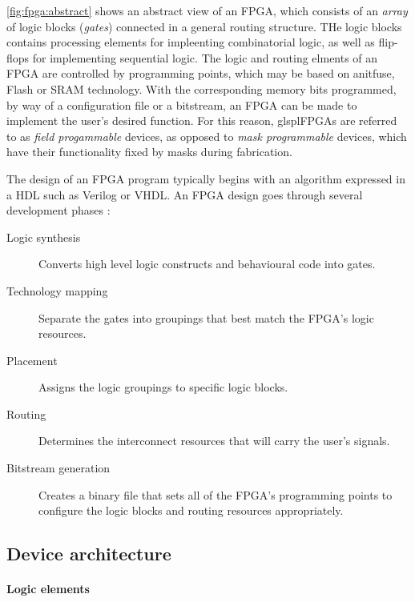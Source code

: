\autoref{fig:fpga:abstract} shows an abstract view of an \gls{FPGA}, which
consists of an \emph{array} of logic blocks (\emph{gates}) connected in a
general routing structure. THe logic blocks contains processing elements for
impleenting combinatorial logic, as well as flip-flops for implementing
sequential logic. The logic and routing elments of an \gls{FPGA} are controlled
by programming points, which may be based on anitfuse, Flash  or \gls{SRAM}
technology. With the corresponding memory bits programmed, by way of a
configuration file or a bitstream, an \gls{FPGA} can be made to implement the
user's desired function. For this reason, glspl{FPGAs} are referred to as
\emph{field progammable} devices, as opposed to \emph{mask programmable}
devices, which have their  functionality fixed by masks during fabrication.

The design of an \gls{FPGA} program typically begins with an algorithm expressed
in a \gls{HDL} such as Verilog or \gls{VHDL}. An \gls{FPGA} design goes through
several development phases \cite{Hauck:2007}:
\begin{description}
    \item[Logic synthesis] Converts high level logic constructs and behavioural
        code into gates.
    \item[Technology mapping] Separate the gates into groupings that best match
        the \gls{FPGA}'s logic resources.
    \item[Placement] Assigns the logic groupings to specific logic blocks.
    \item[Routing] Determines the interconnect resources that will carry the
        user's signals.
    \item[Bitstream generation] Creates a binary file that sets all of the
        \gls{FPGA}'s programming points to configure the logic blocks and
        routing resources appropriately.
\end{description}

\subsection{Device architecture}
\label{fpga:deviceArchitecture}

\paragraph{Logic elements}
\label{fpga:deviceArchitecture:logicElements}

